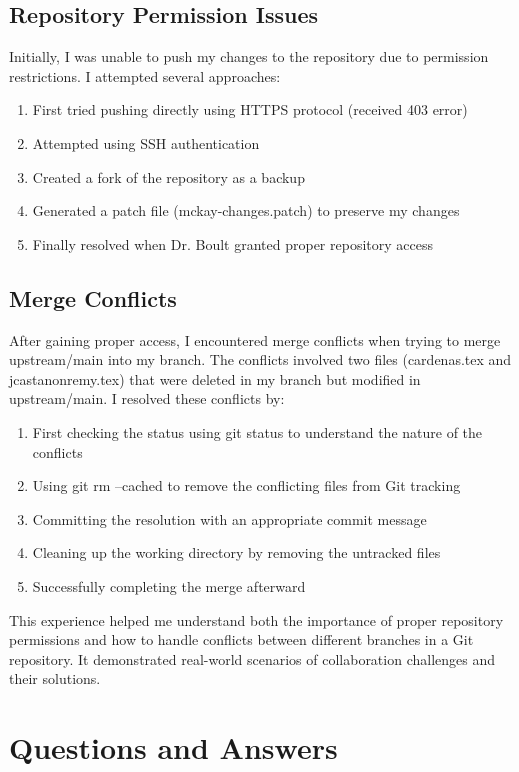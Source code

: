 \documentclass{article}
\begin{document}
\subsection{Repository Permission Issues}
Initially, I was unable to push my changes to the repository due to permission restrictions. I attempted several approaches:
\begin{enumerate}
    \item First tried pushing directly using HTTPS protocol (received 403 error)
    \item Attempted using SSH authentication
    \item Created a fork of the repository as a backup
    \item Generated a patch file (mckay-changes.patch) to preserve my changes
    \item Finally resolved when Dr. Boult granted proper repository access
\end{enumerate}

\subsection{Merge Conflicts}
After gaining proper access, I encountered merge conflicts when trying to merge upstream/main into my branch. 
The conflicts involved two files (cardenas.tex and jcastanonremy.tex) that were deleted in my branch 
but modified in upstream/main. I resolved these conflicts by:
\begin{enumerate}
    \item First checking the status using git status to understand the nature of the conflicts
    \item Using git rm --cached to remove the conflicting files from Git tracking
    \item Committing the resolution with an appropriate commit message
    \item Cleaning up the working directory by removing the untracked files
    \item Successfully completing the merge afterward
\end{enumerate}

This experience helped me understand both the importance of proper repository permissions and 
how to handle conflicts between different branches in a Git repository. It demonstrated 
real-world scenarios of collaboration challenges and their solutions.

\section{Questions and Answers}
\end{document}
